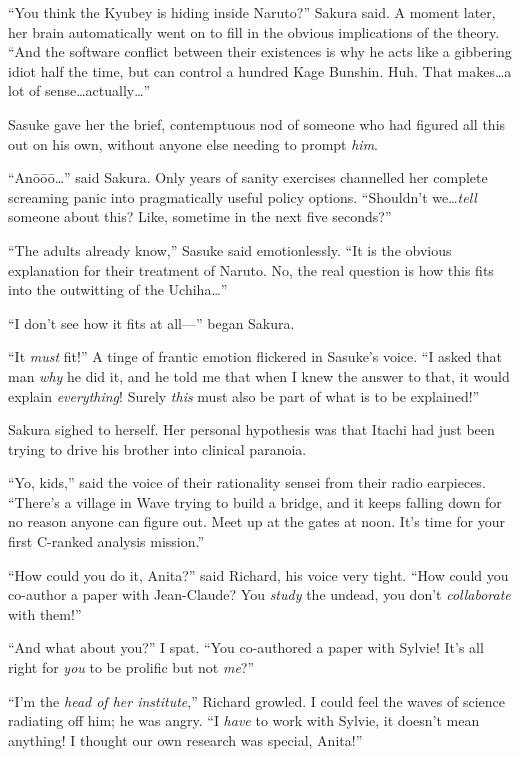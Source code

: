 “You think the Kyubey is hiding inside Naruto?” Sakura said. A moment later, her brain automatically went on to fill in the obvious implications of the theory. “And the software conflict between their existences is why he acts like a gibbering idiot half the time, but can control a hundred Kage Bunshin. Huh. That makes…a lot of sense…actually…”

Sasuke gave her the brief, contemptuous nod of someone who had figured all this out on his own, without anyone else needing to prompt \emph{him}.

“Anōōō…” said Sakura. Only years of sanity exercises channelled her complete screaming panic into pragmatically useful policy options. “Shouldn’t we…\emph{tell} someone about this? Like, sometime in the next five seconds?”

“The adults already know,” Sasuke said emotionlessly. “It is the obvious explanation for their treatment of Naruto. No, the real question is how this fits into the outwitting of the Uchiha…”

“I don’t see how it fits at all—” began Sakura.

“It \emph{must} fit!” A tinge of frantic emotion flickered in Sasuke’s voice. “I asked that man \emph{why} he did it, and he told me that when I knew the answer to that, it would explain \emph{everything}! Surely \emph{this} must also be part of what is to be explained!”

Sakura sighed to herself. Her personal hypothesis was that Itachi had just been trying to drive his brother into clinical paranoia.

“Yo, kids,” said the voice of their rationality sensei from their radio earpieces. “There’s a village in Wave trying to build a bridge, and it keeps falling down for no reason anyone can figure out. Meet up at the gates at noon. It’s time for your first C-ranked analysis mission.”

\clearpage
{}

“How could you do it, Anita?” said Richard, his voice very tight. “How could you co-author a paper with Jean-Claude? You \emph{study} the undead, you don’t \emph{collaborate} with them!”

“And what about you?” I spat. “You co-authored a paper with Sylvie! It’s all right for \emph{you} to be prolific but not \emph{me}?”

“I’m the \emph{head of her institute},” Richard growled. I could feel the waves of science radiating off him; he was angry. “I \emph{have} to work with Sylvie, it doesn’t mean anything! I thought our own research was special, Anita!”

